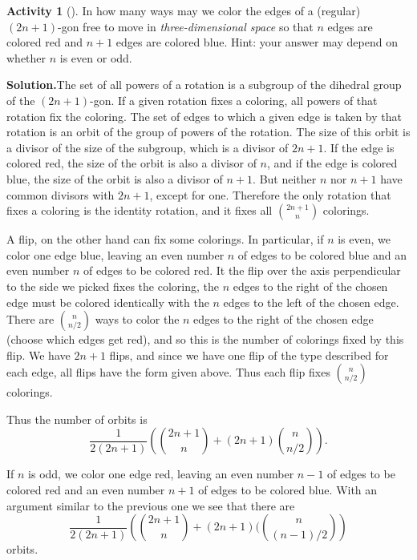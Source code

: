 \documentclass[10pt,]{book}
\theoremstyle{plain}
\theoremstyle{definition}
\newtheorem{activity}[project]{Activity}
\numberwithin{equation}{chapter}
\begin{document}
\begin{activity}[]\label{activity-301}
In how many ways may we color the edges of a (regular) \((2n+1)\)-gon free to move in \emph{three-dimensional space} so that \(n\) edges are colored red and \(n+1\) edges are colored blue. Hint: your answer may depend on whether \(n\) is even or odd.%
\par\medskip\noindent%
\textbf{Solution.}\quad The set of all powers of a rotation is a subgroup of the dihedral group of the \((2n+1)\)-gon. If a given rotation fixes a coloring, all powers of that rotation fix the coloring. The set of edges to which a given edge is taken by that rotation is an orbit of the group of powers of the rotation. The size of this orbit is a divisor of the size of the subgroup, which is a divisor of \(2n+1\). If the edge is colored red, the size of the orbit is also a divisor of \(n\), and if the edge is colored blue, the size of the orbit is also a divisor of \(n+1\). But neither \(n\) nor \(n+1\) have common divisors with \(2n+1\), except for one. Therefore the only rotation that fixes a coloring is the identity rotation, and it fixes all \(\binom{2n+1}{n}\) colorings.%
\par
A flip, on the other hand can fix some colorings. In particular, if \(n\) is even, we color one edge blue, leaving an even number \(n\) of edges to be colored blue and an even number \(n\) of edges to be colored red. It the flip over the axis perpendicular to the side we picked fixes the coloring, the \(n\) edges to the right of the chosen edge must be colored identically with the \(n\) edges to the left of the chosen edge. There are \(\binom{n}{n/2}\) ways to color the \(n\) edges to the right of the chosen edge (choose which edges get red), and so this is the number of colorings fixed by this flip. We have \(2n+1\) flips, and since we have one flip of the type described for each edge, all flips have the form given above. Thus each flip fixes \(\binom{n}{n/2}\) colorings.%
\par
Thus the number of orbits is%
\begin{equation*}
\frac{1}{2(2n+1)}\left(\binom{2n+1}{n} +
(2n+1)\binom{n}{n/2}\right).
\end{equation*}
%
\par
If \(n\) is odd, we color one edge red, leaving an even number \(n-1\) of edges to be colored red and an even number \(n+1\) of edges to be colored blue. With an argument similar to the previous one we see that there are%
\begin{equation*}
\frac{1}{2(2n+1)}\left(\binom{2n+1}{n} + (2n+1)(\binom{n}{(n-1)/2}\right)
\end{equation*}
orbits.%
\end{activity}
\end{document}
